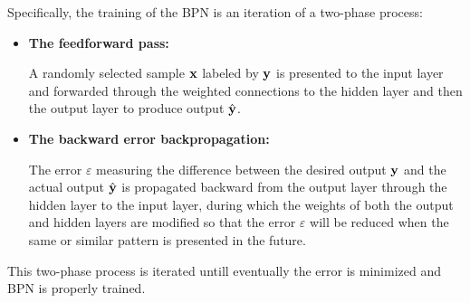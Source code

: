 \documentclass{article}
\begin{document}
Specifically, the training of the BPN is an iteration of a two-phase 
process:
\begin{itemize}
\item {\bf The feedforward pass:} 

  A randomly selected sample ${\bf x}$ labeled by ${\bf y}$ is presented 
  to the input layer and forwarded through the weighted connections to 
  the hidden layer and then the output layer to produce output $\hat{\bf y}$. 

\item {\bf The backward error backpropagation:} 

  The error $\varepsilon$ measuring the difference between the desired 
  output ${\bf y}$ and the actual output $\hat{\bf y}$ is propagated 
  backward from the output layer through the hidden layer to the input 
  layer, during which the weights of both the output and hidden layers
  are modified so that the error $\varepsilon$ will be reduced when the 
  same or similar pattern is presented in the future.
\end{itemize}
This two-phase process is iterated untill eventually the error is
minimized and BPN is properly trained. 
\end{document}
